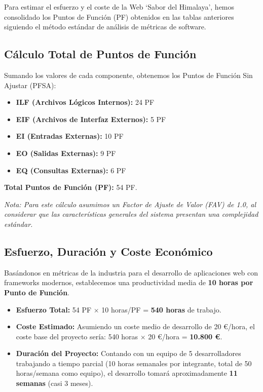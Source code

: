 \documentclass[12pt,a4paper]{article}
\begin{document}
Para estimar el esfuerzo y el coste de la Web `Sabor del Himalaya', hemos consolidado los Puntos de Función (PF) obtenidos en las tablas anteriores siguiendo el método estándar de análisis de métricas de software.

\subsection{Cálculo Total de Puntos de Función}
Sumando los valores de cada componente, obtenemos los Puntos de Función Sin Ajustar (PFSA):
\begin{itemize}
    \item \textbf{ILF (Archivos Lógicos Internos):} 24 PF
    \item \textbf{EIF (Archivos de Interfaz Externos):} 5 PF
    \item \textbf{EI (Entradas Externas):} 10 PF
    \item \textbf{EO (Salidas Externas):} 9 PF
    \item \textbf{EQ (Consultas Externas):} 6 PF
\end{itemize}
\textbf{Total Puntos de Función (PF):} 54 PF.

\textit{Nota: Para este cálculo asumimos un Factor de Ajuste de Valor (FAV) de 1.0, al considerar que las características generales del sistema presentan una complejidad estándar.}

\subsection{Esfuerzo, Duración y Coste Económico}
Basándonos en métricas de la industria para el desarrollo de aplicaciones web con frameworks modernos, establecemos una productividad media de \textbf{10 horas por Punto de Función}.

\begin{itemize}
    \item \textbf{Esfuerzo Total:} 54 PF $\times$ 10 horas/PF = \textbf{540 horas} de trabajo.
    \item \textbf{Coste Estimado:} Asumiendo un coste medio de desarrollo de 20 \euro{}/hora, el coste base del proyecto sería: 540 horas $\times$ 20 \euro{}/hora = \textbf{10.800 \euro{}}.
    \item \textbf{Duración del Proyecto:} Contando con un equipo de 5 desarrolladores trabajando a tiempo parcial (10 horas semanales por integrante, total de 50 horas/semana como equipo), el desarrollo tomará aproximadamente \textbf{11 semanas} (casi 3 meses).
\end{itemize}
\end{document}
